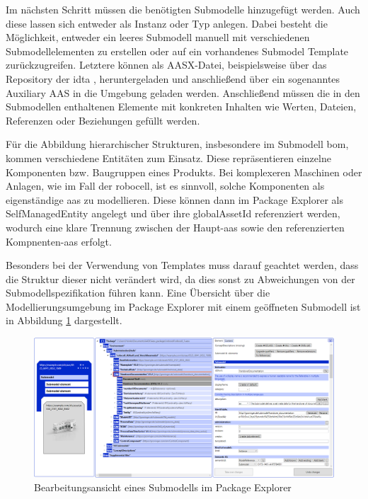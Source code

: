 Im nächsten Schritt müssen die benötigten Submodelle hinzugefügt werden. Auch diese lassen sich entweder als Instanz oder Typ anlegen.
Dabei besteht die Möglichkeit, entweder ein leeres Submodell manuell mit verschiedenen Submodellelementen zu erstellen oder auf ein vorhandenes Submodel Template zurückzugreifen.
Letztere können als AASX-Datei, beispielsweise über das Repository der \acs{idta} \cite{idtaTemplates}, heruntergeladen und anschließend über ein sogenanntes Auxiliary AAS in die Umgebung geladen werden.
Anschließend müssen die in den Submodellen enthaltenen Elemente mit konkreten Inhalten wie Werten, Dateien, Referenzen oder Beziehungen gefüllt werden.

Für die Abbildung hierarchischer Strukturen, insbesondere im Submodell \acs{bom}, kommen verschiedene Entitäten zum Einsatz.
Diese repräsentieren einzelne Komponenten bzw. Baugruppen eines Produkts.
Bei komplexeren Maschinen oder Anlagen, wie im Fall der robocell, ist es sinnvoll, solche Komponenten als eigenständige \acs{aas} zu modellieren.
Diese können dann im Package Explorer als SelfManagedEntity angelegt und über ihre globalAssetId referenziert werden, wodurch eine klare Trennung zwischen der Haupt-\acs{aas} sowie den referenzierten Kompnenten-\acs{aas} erfolgt.

Besonders bei der Verwendung von Templates muss darauf geachtet werden, dass die Struktur dieser nicht verändert wird, da dies sonst zu Abweichungen von der Submodellspezifikation führen kann.
Eine Übersicht über die Modellierungsumgebung im Package Explorer mit einem geöffneten Submodell ist in Abbildung \ref{fig:BearbeitungsansichtPackageExplorer} dargestellt.

\begin{figure}[htbp]
    \centering
    \includegraphics[width=1\textwidth]{Bilder/ModellierungAAS/ModellierungMitDokumentation.PNG}
    \caption{Bearbeitungsansicht eines Submodells im Package Explorer}
    \label{fig:BearbeitungsansichtPackageExplorer}
\end{figure}

